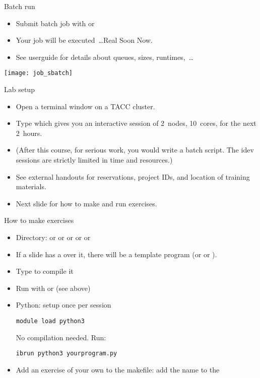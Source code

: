 \begin{numberedframe}{Batch run}
  \begin{itemize}
  \item Submit batch job with  or 
  \item Your job will be executed~\ldots Real Soon Now.
  \item See userguide for details about queues, sizes, runtimes,~\ldots
  \end{itemize}
  \texttt{[image: job\_sbatch]}
\end{numberedframe}

\begin{tacc}
\begin{numberedframe}{Lab setup}
    \begin{itemize}
    \item Open a terminal window on a TACC cluster.
    \item Type  which gives
      you an interactive session of 2~nodes, 10~cores, for the next
      2~hours.
    \item (After this course, for serious work, you would write a
      batch script. The idev sessions are strictly limited in time and
      resources.)
    \item See external handouts for reservations, project IDs,
      and location of training materials.
    \item Next slide for how to make and run exercises.
    \end{itemize}
\end{numberedframe}
\end{tacc}

\begin{numberedframe}{How to make exercises}
  \begin{itemize}
  \item Directory:  or  or  or 
    or  or 
  \item If a slide has a  over it, there will be a
    template program  (or  or ).
  \item Type  to compile it
  \item Run with  or  (see above)
  \item Python: setup once per session
\begin{verbatim}
module load python3
\end{verbatim}
No compilation needed. Run:
\begin{verbatim}
ibrun python3 yourprogram.py
\end{verbatim}
\item Add an exercise of your own to the makefile: add the name to
    the 
  \end{itemize}
\end{numberedframe}

